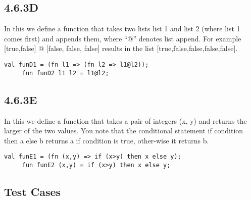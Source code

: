 \documentclass{report}
\begin{document}

 \subsection{4.6.3D}
 \label{sec:4.6.3d}

 In this we define a function that takes two lists list 1 and list 2
 (where list 1 comes first) and appends them, where “@” denotes list
 append. For example [true,false] @ [false, false, false] results in
 the list [true,false,false,false,false].


   \lstset{frameround=tttt}
    \begin{lstlisting}[frame=tRBL]
     val funD1 = (fn l1 => (fn l2 => l1@l2));
     fun funD2 l1 l2 = l1@l2; 
    \end{lstlisting}



 \subsection{4.6.3E}
 \label{sec:4.6.3e}

 In this we define a function that takes a pair of integers (x, y) and
 returns the larger of the two values. You note that the conditional
 statement if condition then a else b returns a if condition is true,
 other-wise it returns b.


   \lstset{frameround=tttt}
    \begin{lstlisting}[frame=tRBL]
     val funE1 = (fn (x,y) => if (x>y) then x else y);
     fun funE2 (x,y) = if (x>y) then x else y;
    \end{lstlisting}

\subsection{Test Cases}
\label{sec:test-cases}
\end{document}
